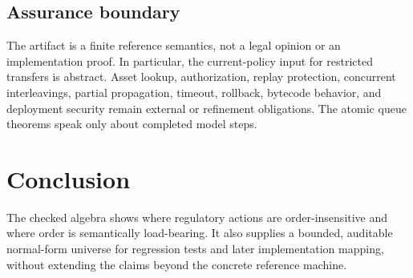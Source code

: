 \documentclass[11pt,a4paper]{article}
\begin{document}
\subsection{Assurance boundary}

The artifact is a finite reference semantics, not a legal opinion or an
implementation proof.  In particular, the current-policy input for restricted
transfers is abstract.  Asset lookup, authorization, replay protection,
concurrent interleavings, partial propagation, timeout, rollback, bytecode
behavior, and deployment security remain external or refinement obligations.
The atomic queue theorems speak only about completed model steps.



\section{Conclusion}

The checked algebra shows where regulatory actions are order-insensitive and
where order is semantically load-bearing.  It also supplies a bounded,
auditable normal-form universe for regression tests and later implementation
mapping, without extending the claims beyond the concrete reference machine.



\end{document}
